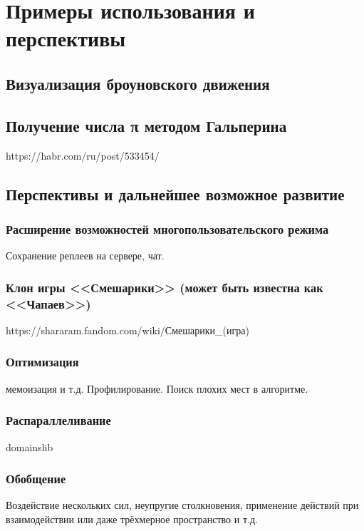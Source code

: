 \chapter{Примеры использования и перспективы}

\TODO

\section{Визуализация броуновского движения}

\TODO

\section{Получение числа π методом Гальперина}\label{pipool}

\TODO https://habr.com/ru/post/533454/

\section{Перспективы и дальнейшее возможное развитие}

\subsection{Расширение возможностей многопользовательского режима}

\TODO Сохранение реплеев на сервере, чат.

\subsection{Клон игры <<Смешарики>> (может быть известна как <<Чапаев>>)}

\TODO https://shararam.fandom.com/wiki/Смешарики\_(игра)

\subsection{Оптимизация}

\TODO мемоизация и т.д.
Профилирование. Поиск плохих мест в алгоритме.

\subsection{Распараллеливание}

\TODO domainslib

\subsection{Обобщение \TODO}

\TODO Воздействие нескольких сил, неупругие столкновения,
применение действий при взаимодействии или даже трёхмерное пространство и т.д.


\TODO
